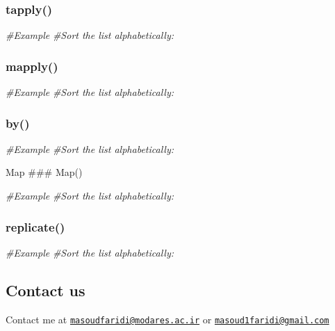 \documentclass[
]{article}
\newenvironment{Shaded}{\begin{snugshade}}{\end{snugshade}}
\newcommand{\CommentTok}[1]{\textcolor[rgb]{0.56,0.35,0.01}{\textit{#1}}}
\begin{document}
\hypertarget{tapply}{%
\subsubsection{tapply()}\label{tapply}}

\begin{Shaded}
\begin{Highlighting}[]
\CommentTok{\#Example}
\CommentTok{\#Sort the list alphabetically:}
\end{Highlighting}
\end{Shaded}

\hypertarget{mapply}{%
\subsubsection{mapply()}\label{mapply}}

\begin{Shaded}
\begin{Highlighting}[]
\CommentTok{\#Example}
\CommentTok{\#Sort the list alphabetically:}
\end{Highlighting}
\end{Shaded}

\hypertarget{by}{%
\subsubsection{by()}\label{by}}

\begin{Shaded}
\begin{Highlighting}[]
\CommentTok{\#Example}
\CommentTok{\#Sort the list alphabetically:}
\end{Highlighting}
\end{Shaded}

Map \#\#\# Map()

\begin{Shaded}
\begin{Highlighting}[]
\CommentTok{\#Example}
\CommentTok{\#Sort the list alphabetically:}
\end{Highlighting}
\end{Shaded}

\hypertarget{replicate}{%
\subsubsection{replicate()}\label{replicate}}

\begin{Shaded}
\begin{Highlighting}[]
\CommentTok{\#Example}
\CommentTok{\#Sort the list alphabetically:}
\end{Highlighting}
\end{Shaded}

\hypertarget{contact-us}{%
\subsection{Contact us}\label{contact-us}}

Contact me at
\href{mailto:masoudfaridi@modares.ac.ir}{\nolinkurl{masoudfaridi@modares.ac.ir}}
or
\href{mailto:masoud1faridi@gmail.com}{\nolinkurl{masoud1faridi@gmail.com}}
\end{document}
